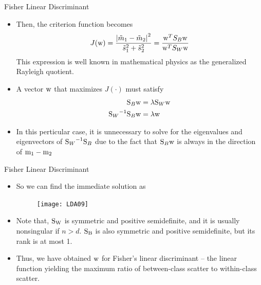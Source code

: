 \begin{frame}{Fisher Linear Discriminant}
\begin{itemize}
\item Then, the criterion function becomes
\[J({\rm w}) = \frac{{{{\left| {{{\tilde m}_1} - {{\tilde m}_2}} \right|}^2}}}{{\tilde s_1^2 + \tilde s_2^2}} = \frac{{{{\rm w}^T}{S_B}{\rm w}}}{{{{\rm w}^T}{S_W}{\rm w}}}\]
This expression is well known in mathematical physics as the generalized Rayleigh quotient.
\item A vector ${\rm w}$ that maximizes $J(\cdot)$ must satisfy
\begin{align}
{\rm S}_B{\rm w}&=\lambda {\rm S}_W{\rm w} \nonumber\\
{{\rm S}_W}^{-1}{\rm S}_B{\rm w}&=\lambda {\rm w}\nonumber
\end{align}
\item In this perticular case, it is unnecessary to solve for the eigenvalues and eigenvectors of ${{\rm S}_W}^{-1}{\rm S}_B$ due to the fact that ${\rm S}_B{\rm w}$ is always in the direction of ${\rm m}_1-{\rm m}_2$
\end{itemize}
\end{frame}

\begin{frame}{Fisher Linear Discriminant}
\begin{itemize}
\item So we can find the immediate solution as
\begin{figure}
\texttt{[image: LDA09]}
\end{figure}
\item Note that, ${\rm S_W}$ is symmetric and positive semidefinite, and it is usually nonsingular if $n > d$. ${\rm S_B}$ is also symmetric and positive semidefinite, but its rank is at most 1.
\item Thus, we have obtained ${\rm w}$ for Fisher's linear discriminant -- the linear function yielding the maximum ratio of between-class scatter to within-class scatter.
\end{itemize}
\end{frame}

